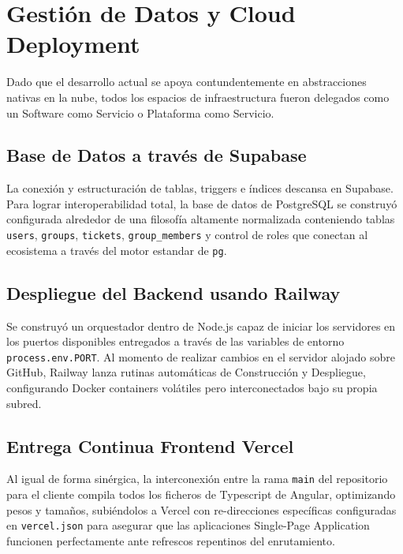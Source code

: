 \documentclass[12pt,a4paper]{report}
\begin{document}
\section{Gestión de Datos y Cloud Deployment}
Dado que el desarrollo actual se apoya contundentemente en abstracciones nativas en la nube, todos los espacios de infraestructura fueron delegados como un Software como Servicio o Plataforma como Servicio.

\subsection{Base de Datos a través de Supabase}
La conexión y estructuración de tablas, triggers e índices descansa en Supabase. Para lograr interoperabilidad total, la base de datos de PostgreSQL se construyó configurada alrededor de una filosofía altamente normalizada conteniendo tablas \texttt{users}, \texttt{groups}, \texttt{tickets}, \texttt{group\_members} y control de roles que conectan al ecosistema a través del motor estandar de \texttt{pg}.

\subsection{Despliegue del Backend usando Railway}
Se construyó un orquestador dentro de Node.js capaz de iniciar los servidores en los puertos disponibles entregados a través de las variables de entorno \texttt{process.env.PORT}. Al momento de realizar cambios en el servidor alojado sobre GitHub, Railway lanza rutinas automáticas de Construcción y Despliegue, configurando Docker containers volátiles pero interconectados bajo su propia subred.

\subsection{Entrega Continua Frontend Vercel}
Al igual de forma sinérgica, la interconexión entre la rama \texttt{main} del repositorio para el cliente compila todos los ficheros de Typescript de Angular, optimizando pesos y tamaños, subiéndolos a Vercel con re-direcciones específicas configuradas en \texttt{vercel.json} para asegurar que las aplicaciones Single-Page Application funcionen perfectamente ante refrescos repentinos del enrutamiento.


\end{document}
